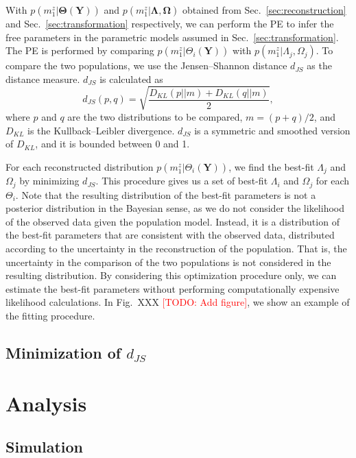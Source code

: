 \documentclass[aps,prd,twocolumn,superscriptaddress,preprintnumbers,nofootinbib,hidelinks]{revtex4-2}
\newcommand{\todo}[1]{\textcolor{red}{[TODO: #1]}}
\begin{document}
With $p(m^z_1|\mathbf{\Theta}(\mathbf{Y}))$ and $p(m^z_1|\mathbf{\Lambda}, \mathbf{\Omega})$ obtained from Sec.~\ref{sec:reconstruction} and Sec.~\ref{sec:transformation} respectively, we can perform the \ac{PE} to infer the free parameters in the parametric models assumed in Sec.~\ref{sec:transformation}.
The \ac{PE} is performed by comparing $p(m^z_1|\Theta_i(\mathbf{Y}))$ with $p(m^z_1|\Lambda_j, \Omega_j)$.
To compare the two populations, we use the Jensen–Shannon distance $d_{JS}$ as the distance measure.
$d_{JS}$ is calculated as
\begin{equation}
    d_{JS}(p, q) = \sqrt{\frac{D_{KL}(p||m) + D_{KL}(q||m)}{2}},
\end{equation}
where $p$ and $q$ are the two distributions to be compared, $m = (p + q) / 2$, and $D_{KL}$ is the Kullback–Leibler divergence.
$d_{JS}$ is a symmetric and smoothed version of $D_{KL}$, and it is bounded between 0 and 1.

For each reconstructed distribution $p(m^z_1|\Theta_i(\mathbf{Y}))$, we find the best-fit $\Lambda_j$ and $\Omega_j$ by minimizing $d_{JS}$.
This procedure gives us a set of best-fit $\Lambda_i$ and $\Omega_j$ for each $\Theta_i$.
Note that the resulting distribution of the best-fit parameters is not a posterior distribution in the Bayesian sense, as we do not consider the likelihood of the observed data given the population model.
Instead, it is a distribution of the best-fit parameters that are consistent with the observed data, distributed according to the uncertainty in the reconstruction of the population.
That is, the uncertainty in the comparison of the two populations is not considered in the resulting distribution.
By considering this optimization procedure only, we can estimate the best-fit parameters without performing computationally expensive likelihood calculations.
In Fig.~XXX \todo{Add figure}, we show an example of the fitting procedure.

\subsection{Minimization of $d_{JS}$}
\label{sec:minimization}

\section{Analysis}
\label{sec:analysis}

\subsection{Simulation}
\label{sec:injection-setup}
\end{document}
